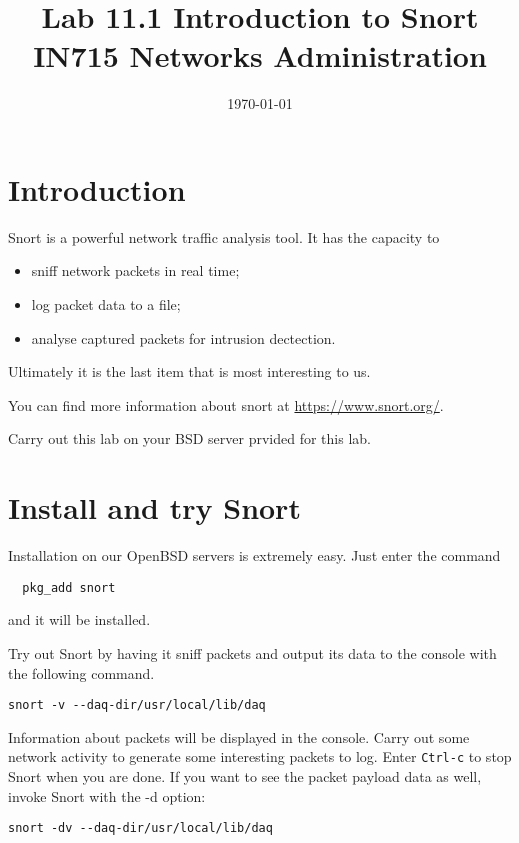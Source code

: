 \documentclass{article}
\begin{document}
\title{ Lab 11.1 Introduction to Snort\\ IN715 Networks Administration}
\date{\today}
\maketitle

\section*{Introduction}
Snort is a powerful network traffic analysis tool.  It has the capacity to 

\begin{itemize}
		 \item sniff network packets in real time;
		 \item log packet data to a file;
		 \item analyse captured packets for intrusion dectection.
	 \end{itemize}

Ultimately it is the last item that is most interesting to us.

You can find more information about snort at \url{https://www.snort.org/}.

Carry out this lab on your BSD server prvided for this lab.

\section{Install and try Snort}
Installation on our OpenBSD servers is extremely easy.  Just enter the command

\begin{verbatim}
  pkg_add snort
\end{verbatim}

and it will be installed.

Try out Snort by having it sniff packets and output its data to the console with the following command.

\begin{verbatim}
snort -v --daq-dir/usr/local/lib/daq
\end{verbatim}

Information about packets will be displayed in the console. Carry out some network activity to generate some interesting packets to log.  Enter \texttt{Ctrl-c} to stop Snort when you are done.  If you want to see the packet payload data as well, invoke Snort with the -d option:


\begin{verbatim}
snort -dv --daq-dir/usr/local/lib/daq
\end{verbatim}
\end{document}
